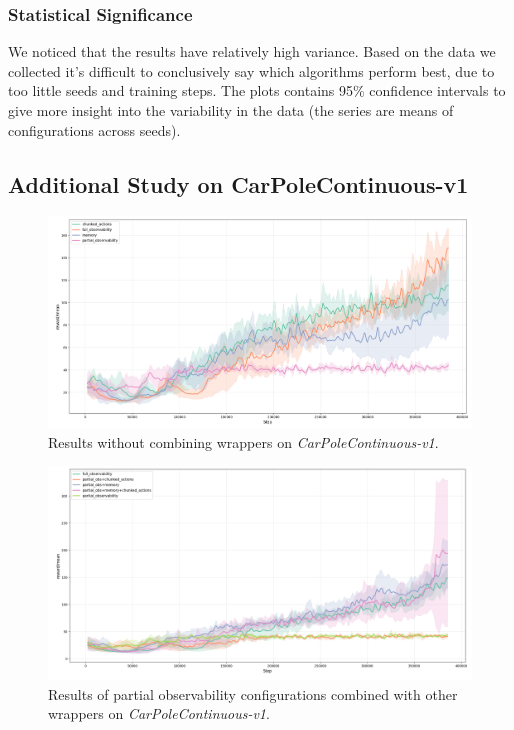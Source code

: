 \documentclass[12pt, a4paper]{article}
\begin{document}
\subsubsection{Statistical Significance}
We noticed that the results have relatively high variance. Based on the data we collected it's difficult to conclusively say which algorithms perform best, due to too little seeds and training steps. The plots contains 95\% confidence intervals to give more insight into the variability in the data (the series are means  of configurations across seeds).

\subsection{Additional Study on CarPoleContinuous-v1}
\begin{figure}[H]
	\centering
	\includegraphics[width=1\linewidth]{results_car_pole_basic}
	\caption{Results without combining wrappers on \textit{CarPoleContinuous-v1}.}
	\label{fig:resultscarpolebasic}
\end{figure}

\begin{figure}[H]
	\centering
	\includegraphics[width=1\linewidth]{results_car_pole_combined}
	\caption{Results of partial observability configurations combined with other wrappers on \textit{CarPoleContinuous-v1}.}
	\label{fig:resultscarpolecombined}
\end{figure}
\end{document}
